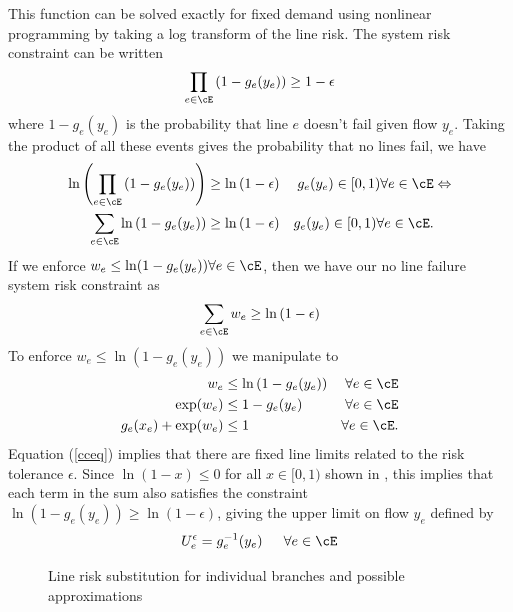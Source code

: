 This function can be solved exactly for fixed demand using nonlinear programming by taking a log transform of the line risk.  The system risk constraint  can be written
\begin{equation*}  \prod_{e \in \cE} \left( 1 - g_e(y_e) \right) \geq 1 - \epsilon
  \end{equation*}  
where $1 - g_e(y_e)$ is the probability that line $e$ doesn't fail given flow $y_e$.  Taking the product of all these events gives the probability that no lines fail, we have
\begin{align*}
  \ln \left( \prod_{e \in \cE}\left( 1 - g_e(y_e)\right) \right) &\geq \ln \left(  1 - \epsilon \right)  & g_e(y_e) \in [0,1) \forall e  \in \cE & \Leftrightarrow \\
  \sum_{e \in \cE} \ln \left( 1-g_e(y_e) \right)  &\geq \ln \left( 1- \epsilon \right) & g_e(y_e) \in [0,1) \forall e  \in \cE. &
\end{align*}
If we enforce $w_e \leq \ln (1-g_e(y_e)) \forall e \in \cE$, then we have our no line failure system risk constraint  as
\begin{equation}\label{cceq}
\sum_{e \in \cE} w_e  \geq \ln \left( 1-\epsilon \right)
\end{equation}
To enforce $w_e \leq \ln \left( 1 -g_e(y_e) \right)$ we manipulate to
\begin{align*}
w_e &\leq \ln \left( 1 - g_e(y_e)\right)  & \forall e \in \cE \\
\exp(w_e) &\leq 1-g_e(y_e)  & \forall e \in \cE \\
g_e(x_e) + \exp(w_e) &\leq 1  & \forall e \in \cE .
\end{align*}
Equation (\ref{cceq}) implies that there are fixed line limits related to the risk tolerance $\epsilon$.  Since $\ln \left(1 - x \right) \leq 0 $  for all $x \in [0,1)$ shown in , this implies that each term in the sum also satisfies the constraint  $\ln \left(1-g_e(y_e)\right) \geq \ln \left( 1-\epsilon \right)$, giving the upper limit on flow $y_e$  defined by
\begin{equation}\label{hardlimit}
U_e^\epsilon = g_e^{-1}(y_e) \hspace{15px} \forall e \in \cE
\end{equation}


\begin{figure}
\begin{center} 

\end{center}
\caption{Line risk substitution for individual branches and possible approximations}\label{fig:linerisksub}
\end{figure}





